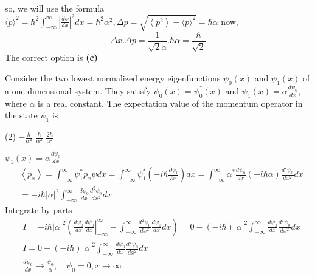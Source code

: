 \begin{enumerate}
\begin{answer}
\begin{align*}
	\end{align*}
	so, we will use the formula $\langle p\rangle^{2}=\hbar^{2} \int_{-\infty}^{\infty}\left|\frac{d \psi}{d x}\right|^{2} d x=\hbar^{2} \alpha^{2}, \Delta p=\sqrt{\left\langle p^{2}\right\rangle-\langle p\rangle^{2}}=\hbar \alpha$ now,
	$$
	\Delta x . \Delta p=\frac{1}{\sqrt{2} \alpha} . \hbar \alpha=\frac{\hbar}{\sqrt{2}}
	$$
	The correct option is \textbf{(c)}
\end{answer}
\begin{minipage}{\textwidth}
	\item Consider the two lowest normalized energy eigenfunctions $\psi_{0}(x)$ and $\psi_{1}(x)$ of a one dimensional system. They satisfy $\psi_{0}(x)=\psi_{0}^{*}(x)$ and $\psi_{1}(x)=\alpha \frac{d \psi_{0}}{d x}$, where $\alpha$ is a real constant. The expectation value of the momentum operator in the state $\psi_{1}$ is
\end{minipage}
\begin{tasks}(2)
	\task[\textbf{A.}] $-\frac{\hbar}{\alpha^{2}}$
	\task[\textbf{C.}]$\frac{\hbar}{\alpha^{2}}$
	\task[\textbf{D.}]$\frac{2 \hbar}{\alpha^{2}}$
\end{tasks}
\begin{answer}
	$\psi_{1}(x)=\alpha \frac{d \psi_{0}}{d x}$\\
	\begin{align*}
		&\left\langle p_{x}\right\rangle=\int_{-\infty}^{\infty} \psi_{1}^{*} p_{x} \psi d x=\int_{-\infty}^{\infty} \psi_{1}^{*}\left(-i \hbar \frac{\partial \psi_{1}}{\partial x}\right) d x=\int_{-\infty}^{\infty} \alpha^{*} \frac{d \psi_{0}}{d x}(-i \hbar \alpha) \frac{d^{2} \psi_{0}}{d x^{2}} d x \\
		&=-i \hbar|\alpha|^{2} \int_{-\infty}^{\infty} \frac{d \psi_{0}}{d x} \frac{d^{2} \psi_{0}}{d x^{2}} d x
	\end{align*}
	Integrate by parts
	\begin{align*}
	&I=-i \hbar|\alpha|^{2}\left(\left.\frac{d \psi_{0}}{d x} \frac{d \psi_{0}}{d x}\right|_{-\infty} ^{\infty}-\int_{-\infty}^{\infty} \frac{d^{2} \psi_{0}}{d x^{2}} \frac{d \psi_{0}}{d x} d x\right)=0-(-i \hbar)|\alpha|^{2} \int_{-\infty}^{\infty} \frac{d \psi_{0}}{d x} \frac{d^{2} \psi_{0}}{d x^{2}} d x \\
	&I=0-(-i \hbar)|\alpha|^{2} \int_{-\infty}^{\infty} \frac{d \psi_{0}}{d x} \frac{d^{2} \psi_{0}}{d x^{2}} d x \\
	&\frac{d \psi_{0}}{d x} \rightarrow \frac{\psi_{0}}{\alpha}, \quad \psi_{0}=0, x \rightarrow \infty \\

\end{align*}
\end{answer}
\end{enumerate}

